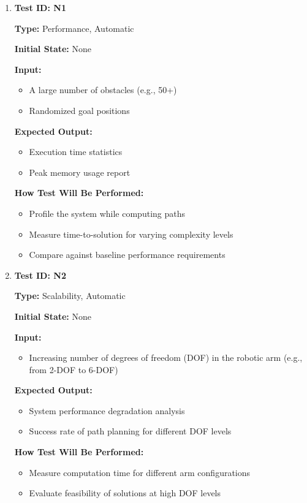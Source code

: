 \documentclass[12pt, titlepage]{article}
\begin{document}
\begin{enumerate}

\item \textbf{Test ID: N1}  

\textbf{Type:} Performance, Automatic  

\textbf{Initial State:} None  

\textbf{Input:}  
\begin{itemize}
    \item A large number of obstacles (e.g., 50+)  
    \item Randomized goal positions  
\end{itemize}

\textbf{Expected Output:}  
\begin{itemize}
    \item Execution time statistics  
    \item Peak memory usage report  
\end{itemize}

\textbf{How Test Will Be Performed:}  
\begin{itemize}
    \item Profile the system while computing paths  
    \item Measure time-to-solution for varying complexity levels  
    \item Compare against baseline performance requirements  
\end{itemize}

\item \textbf{Test ID: N2}  

\textbf{Type:} Scalability, Automatic  

\textbf{Initial State:} None  

\textbf{Input:}  
\begin{itemize}
    \item Increasing number of degrees of freedom (DOF) in the robotic arm (e.g., from 2-DOF to 6-DOF)  
\end{itemize}

\textbf{Expected Output:}  
\begin{itemize}
    \item System performance degradation analysis  
    \item Success rate of path planning for different DOF levels  
\end{itemize}

\textbf{How Test Will Be Performed:}  
\begin{itemize}
    \item Measure computation time for different arm configurations  
    \item Evaluate feasibility of solutions at high DOF levels  
\end{itemize}

\end{enumerate}
\end{document}
